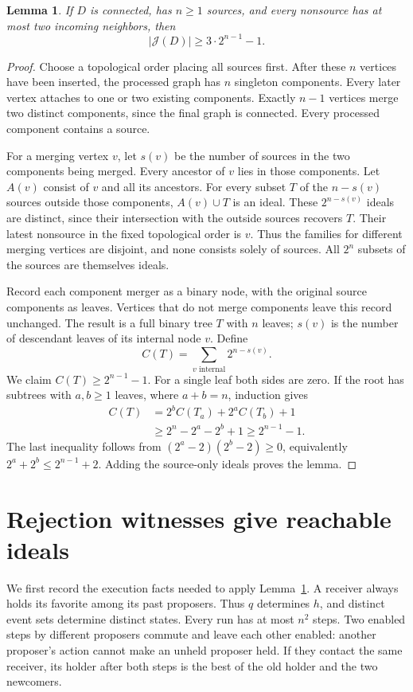 \documentclass[11pt]{article}
\newtheorem{lemma}[theorem]{Lemma}
\newcommand{\Id}{\mathcal J}
\begin{document}
\begin{lemma}\label{lem:dag}
If $D$ is connected, has $n\ge1$ sources, and every nonsource has at most
two incoming neighbors, then
\[
                         |\Id(D)|\ge3\cdot2^{n-1}-1.
\]
\end{lemma}
\begin{proof}
Choose a topological order placing all sources first. After these $n$
vertices have been inserted, the processed graph has $n$ singleton
components. Every later vertex attaches to one or two existing
components. Exactly $n-1$ vertices merge two distinct components, since
the final graph is connected. Every processed component contains a
source.

For a merging vertex $v$, let $s(v)$ be the number of sources in the two
components being merged. Every ancestor of $v$ lies in those components.
Let $A(v)$ consist of $v$ and all its ancestors. For every subset $T$ of
the $n-s(v)$ sources outside those components, $A(v)\cup T$ is an ideal.
These $2^{n-s(v)}$ ideals are distinct, since their intersection with the
outside sources recovers $T$. Their latest nonsource in the fixed
topological order is $v$. Thus the families for different merging
vertices are disjoint, and none consists solely of sources. All $2^n$
subsets of the sources are themselves ideals.

Record each component merger as a binary node, with the original source
components as leaves. Vertices that do not merge components leave this
record unchanged. The result is a full binary tree $T$ with $n$ leaves;
$s(v)$ is the number of descendant leaves of its internal node $v$.
Define
\[
             C(T)=\sum_{v\text{ internal}}2^{n-s(v)}.
\]
We claim $C(T)\ge2^{n-1}-1$. For a single leaf both sides are zero.
If the root has subtrees with $a,b\ge1$ leaves, where $a+b=n$, induction
gives
\begin{align*}
 C(T)&=2^bC(T_a)+2^aC(T_b)+1\\
     &\ge2^n-2^a-2^b+1
      \ge2^{n-1}-1.
\end{align*}
The last inequality follows from $(2^a-2)(2^b-2)\ge0$, equivalently
$2^a+2^b\le2^{n-1}+2$. Adding the source-only ideals proves the lemma.
\end{proof}

\section{Rejection witnesses give reachable ideals}

We first record the execution facts needed to apply
Lemma~\ref{lem:dag}. A receiver always holds its favorite among its past
proposers. Thus $q$ determines $h$, and distinct event sets determine
distinct states. Every run has at most $n^2$ steps. Two enabled steps by
different proposers commute and leave each other enabled: another
proposer's action cannot make an unheld proposer held. If they contact
the same receiver, its holder after both steps is the best of the old
holder and the two newcomers.
\end{document}

